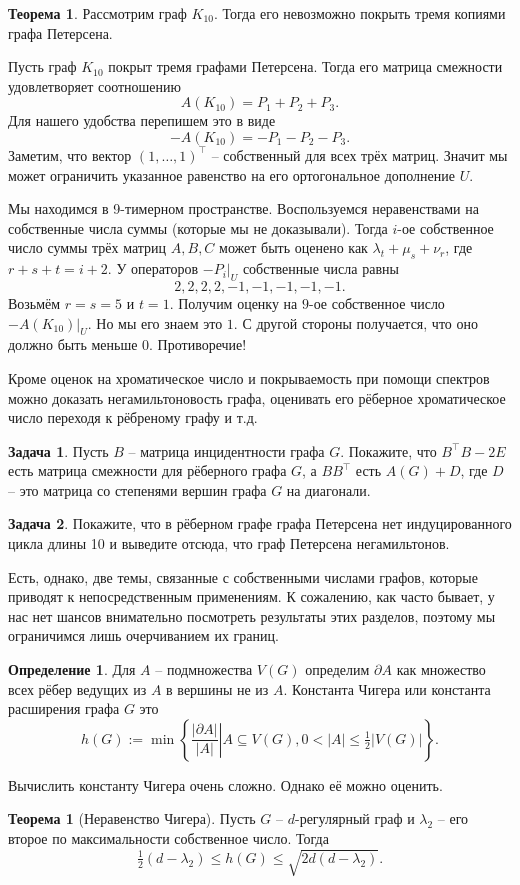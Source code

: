 \documentclass[10pt,a4paper,oneside]{book}
\theoremstyle{definition}
\newtheorem{zad}{\color{violet!100!black}Задача}
\newtheorem*{defn}{\color{yellow!30!red} Определение}
\newtheorem{thm}{\color{red!40!black}Теорема}
\newtheorem*{thmm}{\color{red!40!black} Теорема}
\renewcommand{\leq}{\leqslant}
\def\thrm{\begin{thm}}
\def\ethrm{\end{thm}}
\def\dfn{\begin{defn}}
\def\edfn{\end{defn}}
\def\zd{\begin{zad}}
\def\ezd{\end{zad}}
\begin{document}
\thrm Рассмотрим граф $K_{10}$. Тогда его невозможно покрыть тремя копиями графа Петерсена.
\ethrm
\proof Пусть граф $K_{10}$ покрыт тремя графами Петерсена. Тогда его матрица смежности удовлетворяет соотношению 
$$A(K_{10})=P_1+P_2+P_3.$$
Для нашего удобства перепишем это в виде 
$$-A(K_{10})=-P_1-P_2-P_3.$$
Заметим, что вектор $(1,\dots,1)^\top$ -- собственный для всех трёх матриц. Значит мы может ограничить указанное равенство на его ортогональное дополнение $U$.

Мы находимся в 9-тимерном пространстве. Воспользуемся неравенствами на собственные числа суммы (которые мы не доказывали). Тогда $i$-ое собственное число  суммы трёх матриц $A,B,C$ может быть оценено как $\lambda_t +\mu_s+ \nu_r$, где $r+s+t=i+2$. У операторов $-P_i|_U$ собственные числа равны $$2,2,2,2,-1,-1,-1,-1,-1.$$
Возьмём  $r=s=5$ и $t=1$. Получим оценку на $9$-ое собственное число $-A(K_{10})|_U$. Но мы его знаем это $1$. С другой стороны получается, что оно должно быть меньше $0$. Противоречие! 
\endproof

Кроме оценок на хроматическое число и покрываемость при помощи спектров можно доказать негамильтоновость графа, оценивать его рёберное хроматическое число переходя к рёбреному графу и т.д.

\zd Пусть $B$ -- матрица инцидентности графа $G$. Покажите, что $B^\top B - 2 E$ есть матрица смежности для рёберного графа $G$, а $B B^\top$ есть $A(G)+D$, где $D$ -- это матрица со степенями вершин графа $G$ на диагонали. 
\ezd

\zd Покажите, что в рёберном графе графа Петерсена нет индуцированного цикла длины 10 и выведите отсюда, что граф Петерсена негамильтонов.
\ezd

Есть, однако, две темы, связанные с собственными числами графов, которые приводят к непосредственным применениям. К сожалению, как часто бывает, у нас нет шансов внимательно посмотреть результаты этих разделов, поэтому мы ограничимся лишь очерчиванием их границ.




\dfn Для $A$ -- подмножества $V(G)$ определим $\partial A$ как множество всех рёбер ведущих из $A$ в вершины не из $A$. Константа Чигера или константа расширения графа  $G$ это 
$$h(G) := \min \left\{ \left. \frac{| \partial A |}{| A |} \right|   A \subseteq V(G), 0 < | A | \leq \tfrac{1}{2} | V(G)| \right\} .$$
\edfn

Вычислить константу Чигера очень сложно. Однако её можно оценить.

\begin{thmm}[Неравенство Чигера] Пусть $G$ -- $d$-регулярный граф и $\lambda_2$ -- его второе по максимальности собственное число. Тогда
$$\tfrac{1}{2}(d - \lambda_2) \le h(G) \le \sqrt{2d(d - \lambda_2)}.$$
\end{thmm}
\end{document}

